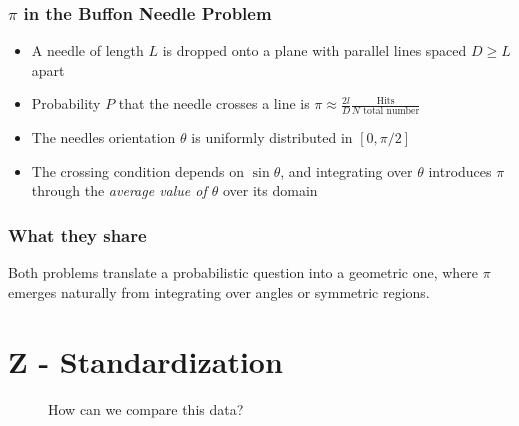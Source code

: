 \documentclass[
  a4paper,
]{scrbook}
\begin{document}
\subsubsection{\texorpdfstring{\(\pi\) in the Buffon Needle
Problem}{\textbackslash pi in the Buffon Needle Problem}}\label{pi-in-the-buffon-needle-problem}

\begin{itemize}
\item
  A needle of length \(L\) is dropped onto a plane with parallel lines
  spaced \(D \geq L\) apart
\item
  Probability \(P\) that the needle crosses a line is
  \(\pi\approx \frac{2l}{D}\frac{\text{Hits}}{N\text{ total number}}\)
\item
  The needles orientation \(\theta\) is uniformly distributed in
  \([0,\pi/2]\)
\item
  The crossing condition depends on \(\sin{\theta}\), and integrating
  over \(\theta\) introduces \(\pi\) through the \emph{average value of
  \(\theta\)} over its domain
\end{itemize}

\subsubsection{What they share}\label{what-they-share}

Both problems translate a probabilistic question into a geometric one,
where \(\pi\) emerges naturally from integrating over angles or
symmetric regions.

\section{Z - Standardization}\label{z---standardization}

\begin{figure}[ht]


\caption{\label{fig-z-scores-raw}How can we compare this data?}

\end{figure}%
\end{document}
